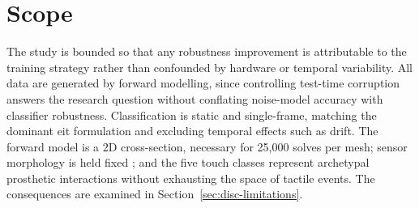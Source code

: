 \section{Scope}
\label{sec:intro-scope}

The study is bounded so that any robustness improvement is attributable to the training strategy rather than confounded by hardware or temporal variability. All data are generated by forward modelling, since controlling test-time corruption answers the research question without conflating noise-model accuracy with classifier robustness. Classification is static and single-frame, matching the dominant \gls{eit} formulation \parencite{park2022skin, chen2023} and excluding temporal effects such as drift. The forward model is a 2D cross-section, necessary for 25{,}000 solves per mesh; sensor morphology is held fixed \parencite{dong2025lattice}; and the five touch classes represent archetypal prosthetic interactions \parencite{silvera-tawil2012eit} without exhausting the space of tactile events. The consequences are examined in Section~\ref{sec:disc-limitations}.


